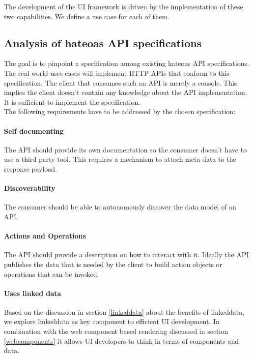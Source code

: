The development of the UI framework is driven by the implementation of these two capabilities. We define a use case for each of them.

\subsection{Analysis of \gls{hateoas} API specifications}
The goal is to pinpoint a specification among existing \gls{hateoas} API specifications. The real world uses cases will implement HTTP APIs that conform to this specification. The client that consumes such an API is merely a \gls{console}. This implies the client doesn't contain any knowledge about the API implementation. It is sufficient to implement the specification. \\
The following requirements have to be addressed by the chosen specification:

\paragraph{Self documenting}
The API should provide its own documentation so the consumer doesn't have to use a third party tool. This requires a mechanism to attach meta data to the response payload.

\paragraph{Discoverability}
The consumer should be able to autonomously discover the data model of an API.

\paragraph{Actions and Operations}
The API should provide a description on how to interact with it. Ideally the API publishes the data that is needed by the client to build action objects or operations that can be invoked.

\paragraph{Uses linked data}
Based on the discussion in section \ref{linkeddata} about the benefits of \gls{linkeddata}, we explore \gls{linkeddata} as key component to efficient UI development. In combination with the web component based rendering discussed in section \ref{webcomponents} it allows UI developers to think in terms of components and data.

